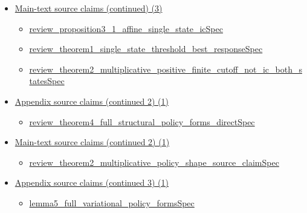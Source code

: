 \documentclass[10pt]{article}
\begin{document}
\begin{itemize}[leftmargin=1.2em]
\begin{itemize}[leftmargin=1.2em]
\item \hyperlink{source-claim-de2ea96cec45a85c}{review\_lemma6\_upper\_endpoint\_derivative\_formulaSpec}
\item \hyperlink{source-claim-414ba26e7a98cabd}{review\_lemma7\_affine\_positive\_additive\_response\_quasi\_convexSpec}
\item \hyperlink{source-claim-72681991e4ec9e7d}{review\_lemma8\_affine\_negative\_additive\_response\_quasi\_concaveSpec}
\item \hyperlink{source-claim-7d5af65772b5a76a}{review\_lemma9\_surge\_derivative\_positive\_of\_acceptAll\_boundsSpec}
\end{itemize}
\item \hyperlink{source-section-c08c7eca66416a2f}{Main-text source claims (continued) (3)}
\begin{itemize}[leftmargin=1.2em]
\item \hyperlink{source-claim-a66252366d7621fe}{review\_proposition3\_1\_affine\_single\_state\_icSpec}
\item \hyperlink{source-claim-cdbb75fcd67baff3}{review\_theorem1\_single\_state\_threshold\_best\_responseSpec}
\item \hyperlink{source-claim-38fbb9f78eb2c2c7}{review\_theorem2\_multiplicative\_positive\_finite\_cutoff\_not\_ic\_both\_statesSpec}
\end{itemize}
\item \hyperlink{source-section-e0bf42a2f186588f}{Appendix source claims (continued 2) (1)}
\begin{itemize}[leftmargin=1.2em]
\item \hyperlink{source-claim-d0eae55048459432}{review\_theorem4\_full\_structural\_policy\_forms\_directSpec}
\end{itemize}
\item \hyperlink{source-section-62736bb95a656bbc}{Main-text source claims (continued 2) (1)}
\begin{itemize}[leftmargin=1.2em]
\item \hyperlink{source-claim-e4ff38b469e6cc30}{review\_theorem2\_multiplicative\_policy\_shape\_source\_claimSpec}
\end{itemize}
\item \hyperlink{source-section-13054b3f2d04f1de}{Appendix source claims (continued 3) (1)}
\begin{itemize}[leftmargin=1.2em]
\item \hyperlink{source-claim-5a2021856d51c6f7}{lemma5\_full\_variational\_policy\_formsSpec}
\end{itemize}

\end{itemize}
\end{document}
